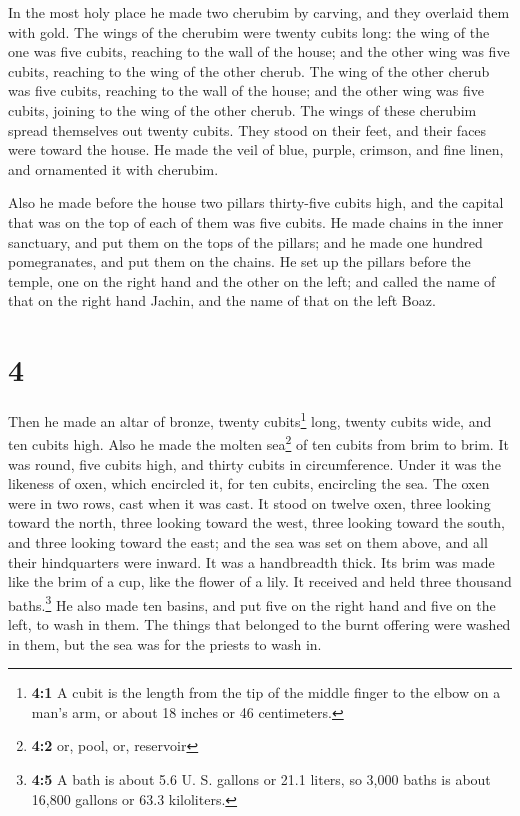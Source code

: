  In the most holy place he made two cherubim by carving,
and they overlaid them with gold.  The wings of the
cherubim were twenty cubits long: the wing of the one was five cubits,
reaching to the wall of the house; and the other wing was five cubits,
reaching to the wing of the other cherub.  The wing of
the other cherub was five cubits, reaching to the wall of the house; and
the other wing was five cubits, joining to the wing of the other cherub.
 The wings of these cherubim spread themselves out twenty
cubits. They stood on their feet, and their faces were toward the house.
 He made the veil of blue, purple, crimson, and fine
linen, and ornamented it with cherubim.

 Also he made before the house two pillars thirty-five
cubits high, and the capital that was on the top of each of them was
five cubits.  He made chains in the inner sanctuary, and
put them on the tops of the pillars; and he made one hundred
pomegranates, and put them on the chains.  He set up the
pillars before the temple, one on the right hand and the other on the
left; and called the name of that on the right hand Jachin, and the name
of that on the left Boaz.

\hypertarget{section-3}{%
\section{4}\label{section-3}}

 Then he made an altar of bronze, twenty cubits\footnote{\textbf{4:1}
  A cubit is the length from the tip of the middle finger to the elbow
  on a man's arm, or about 18 inches or 46 centimeters.} long, twenty
cubits wide, and ten cubits high.  Also he made the molten
sea\footnote{\textbf{4:2} or, pool, or, reservoir} of ten cubits from
brim to brim. It was round, five cubits high, and thirty cubits in
circumference.  Under it was the likeness of oxen, which
encircled it, for ten cubits, encircling the sea. The oxen were in two
rows, cast when it was cast.  It stood on twelve oxen,
three looking toward the north, three looking toward the west, three
looking toward the south, and three looking toward the east; and the sea
was set on them above, and all their hindquarters were inward.
 It was a handbreadth thick. Its brim was made like the
brim of a cup, like the flower of a lily. It received and held three
thousand baths.\footnote{\textbf{4:5} A bath is about 5.6 U. S. gallons
  or 21.1 liters, so 3,000 baths is about 16,800 gallons or 63.3
  kiloliters.}  He also made ten basins, and put five on
the right hand and five on the left, to wash in them. The things that
belonged to the burnt offering were washed in them, but the sea was for
the priests to wash in.

